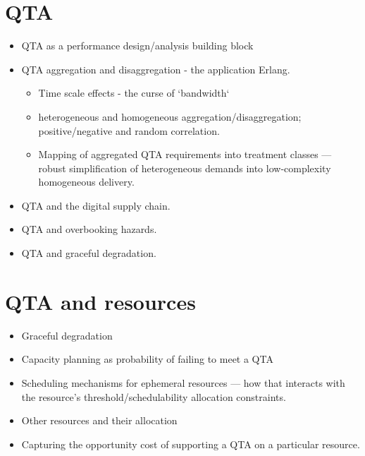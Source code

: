 \documentclass[11pt,a4paper]{article}
\begin{document}
\section{QTA}
\begin{itemize}
  \item QTA as a performance design/analysis building block
  \item QTA aggregation and disaggregation - the application Erlang. 
    \begin{itemize}
      \item Time scale effects - the curse of `bandwidth`
      \item heterogeneous and homogeneous aggregation/disaggregation; 
            positive/negative and random correlation.
      \item Mapping of aggregated QTA requirements into treatment
        classes --- robust simplification of heterogeneous demands
        into low-complexity homogeneous delivery.
    \end{itemize}
  \item QTA and the digital supply chain.
  \item QTA and overbooking hazards.
  \item QTA and graceful degradation.
\end{itemize}
\section{QTA and resources}
\begin{itemize}
  \item Graceful degradation
  \item Capacity planning as probability of failing to meet a QTA
  \item Scheduling mechanisms for ephemeral resources --- how that
    interacts with the resource's threshold/schedulability allocation
    constraints.
  \item Other resources and their allocation
  \item Capturing the opportunity cost of supporting a QTA on a
    particular resource.
\end{itemize}
\end{document}
